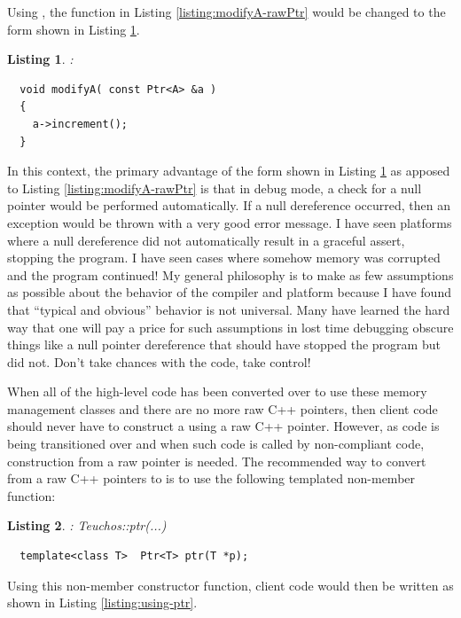 \documentclass[pdf,ps2pdf,11pt]{SANDreport}
\newtheorem{listing}{Listing}
\begin{document}
Using {}, the function {} in Listing
{}\ref{listing:modifyA-rawPtr} would be changed to the form shown in
Listing {}\ref{listing:modifyA-Ptr}.

\begin{listing}:\\
\label{listing:modifyA-Ptr}
{\small\begin{verbatim}
  void modifyA( const Ptr<A> &a )
  {
    a->increment();
  }
\end{verbatim}}
\end{listing}

In this context, the primary advantage of the form shown in Listing
{}\ref{listing:modifyA-Ptr} as apposed to Listing
{}\ref{listing:modifyA-rawPtr} is that in debug mode, a check for a
null pointer would be performed automatically.  If a null dereference
occurred, then an exception would be thrown with a very good error
message.  I have seen platforms where a null dereference did not
automatically result in a graceful assert, stopping the program.  I
have seen cases where somehow memory was corrupted and the program
continued!  My general philosophy is to make as few assumptions as
possible about the behavior of the compiler and platform because I
have found that ``typical and obvious'' behavior is not universal.
Many have learned the hard way that one will pay a price for such
assumptions in lost time debugging obscure things like a null pointer
dereference that should have stopped the program but did not.  Don't
take chances with the code, take control!

When all of the high-level code has been converted over to use these
memory management classes and there are no more raw C++ pointers, then
client code should never have to construct a {} using a
raw C++ pointer.  However, as code is being transitioned over and
when such code is called by non-compliant code, construction from a
raw pointer is needed.  The recommended way to convert from a raw C++
pointers to {} is to use the following templated
non-member function:

\begin{listing}: Teuchos::ptr(...)\\
\label{listing:ptr}
{\small\begin{verbatim}
  template<class T>  Ptr<T> ptr(T *p);
\end{verbatim}}
\end{listing}

Using this non-member constructor function, client code would then be
written as shown in Listing {}\ref{listing:using-ptr}.
\end{document}

